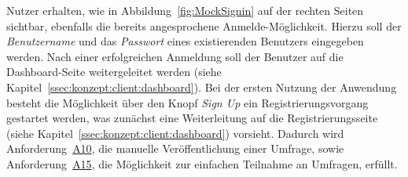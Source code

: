 Nutzer erhalten, wie in Abbildung~\ref{fig:MockSignin} auf der rechten Seiten sichtbar, ebenfalls die bereits angesprochene Anmelde-Möglichkeit.
Hierzu soll der \emph{Benutzername} und das \emph{Passwort} eines existierenden Benutzers eingegeben werden.
Nach einer erfolgreichen Anmeldung soll der Benutzer auf die Dashboard-Seite weitergeleitet werden (siehe Kapitel~\ref{ssec:konzept:client:dashboard}).
Bei der ersten Nutzung der Anwendung besteht die Möglichkeit über den Knopf \emph{Sign Up} ein Registrierungsvorgang gestartet werden, was zunächst eine Weiterleitung auf die Registrierungsseite (siehe Kapitel~\ref{ssec:konzept:client:dashboard}) vorsieht.
Dadurch wird Anforderung~\hyperref[Anf:A10]{A10}, die manuelle Veröffentlichung einer Umfrage, sowie Anforderung~\hyperref[Anf:A15]{A15}, die Möglichkeit zur einfachen Teilnahme an Umfragen, erfüllt.

